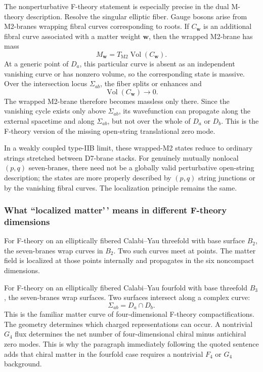 \documentclass[
  10pt,
  a4paper,
  openany]{book}
\begin{document}
The nonperturbative F-theory statement is especially precise in the dual
M-theory description. Resolve the singular elliptic fiber. Gauge bosons
arise from M2-branes wrapping fibral curves corresponding to roots. If
\(C_{\mathbf w}\) is an additional fibral curve associated with a matter
weight \(\mathbf w\), then the wrapped M2-brane has mass \[
M_{\mathbf w}
=T_{\mathrm{M2}}
\operatorname{Vol}(C_{\mathbf w}).
\] At a generic point of \(D_a\), this particular curve is absent as an
independent vanishing curve or has nonzero volume, so the corresponding
state is massive. Over the intersection locus \(\Sigma_{ab}\), the fiber
splits or enhances and \[
\operatorname{Vol}(C_{\mathbf w})\longrightarrow0.
\] The wrapped M2-brane therefore becomes massless only there. Since the
vanishing cycle exists only above \(\Sigma_{ab}\), its wavefunction can
propagate along the external spacetime and along \(\Sigma_{ab}\), but
not over the whole of \(D_a\) or \(D_b\). This is the F-theory version
of the missing open-string translational zero mode.

In a weakly coupled type-IIB limit, these wrapped-M2 states reduce to
ordinary strings stretched between D7-brane stacks. For genuinely
mutually nonlocal \((p,q)\) seven-branes, there need not be a globally
valid perturbative open-string description; the states are more properly
described by \((p,q)\) string junctions or by the vanishing fibral
curves. The localization principle remains the same.

\subsubsection{What ``localized matter'\,' means in different F-theory
dimensions}\label{what-localized-matter-means-in-different-f-theory-dimensions}

For F-theory on an elliptically fibered Calabi--Yau threefold with base
surface \(B_2\), the seven-branes wrap curves in \(B_2\). Two such
curves meet at points. The matter field is localized at those points
internally and propagates in the six noncompact dimensions.

For F-theory on an elliptically fibered Calabi--Yau fourfold with base
threefold \(B_3\), the seven-branes wrap surfaces. Two surfaces
intersect along a complex curve: \[
\Sigma_{ab}=D_a\cap D_b.
\] This is the familiar matter curve of four-dimensional F-theory
compactifications. The geometry determines which charged representations
can occur. A nontrivial \(G_4\) flux determines the net number of
four-dimensional chiral minus antichiral zero modes. This is why the
paragraph immediately following the quoted sentence adds that chiral
matter in the fourfold case requires a nontrivial \(F_4\) or \(G_4\)
background.
\end{document}
